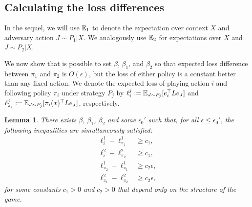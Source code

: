 \documentclass{article}
\newtheorem{lemma}{Lemma}
\begin{document}
\subsection{Calculating the loss differences}
In the sequel, we will use $\mathbb E_1$ to denote the expectation over context $X$ and adversary action $J\sim P_1|X$. We analogously use $\mathbb E_2$ for expectations over $X$ and $J\sim P_2|X$.

We now show that is possible to set $\beta$, $\beta_1$, and $\beta_2$ so that expected loss difference between $\pi_1$ and $\pi_2$ is $O(\epsilon)$, but the loss of either policy is a constant better than any fixed action. We denote the expected loss of playing action $i$ and following policy $\pi_i$ under strategy $P_j$ by $\ell_i^j:=\mathbb E_{J\sim P_j}[e_i^\top L e_J]$ and $\ell_{\pi_i}^j:=\mathbb E_{J\sim P_j}[\pi_i(x)^\top Le_J]$, respectively. 
\begin{lemma}\label{lemma:expected.loss.bounds}
  There exists $\beta$, $\beta_1$, $\beta_2$ and some $\epsilon_0'$ such that, for all $\epsilon\leq\epsilon_0'$, the following inequalities are simultaneously satisfied:
  \begin{align*}
    \ell_i^1 - \ell_{\pi_1}^1 &\geq c_1, \\
    \ell_i^2 - \ell_{\pi_2}^2 &\geq c_1, \\
    \ell_{\pi_2}^1 - \ell_{\pi_1}^1 &\geq c_2 \epsilon,\\
    \ell_{\pi_1}^2 - \ell_{\pi_2}^2 &\geq c_2 \epsilon,
  \end{align*}
  for some constants $c_1>0$ and $c_2>0$ that depend only on the structure of the game. 
\end{lemma}
\end{document}
